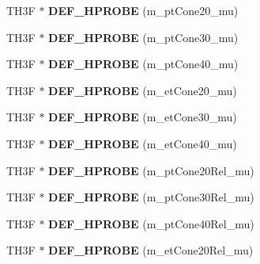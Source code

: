 \begin{DoxyCompactItemize}
\item 
\hypertarget{classHistos__Fake_a475ac1e1f52cff57c6d7583023360922}{
TH3F $\ast$ {\bfseries DEF\_\-HPROBE} (m\_\-ptCone20\_\-mu)}
\label{classHistos__Fake_a475ac1e1f52cff57c6d7583023360922}

\item 
\hypertarget{classHistos__Fake_affffd9bb2c5650168ac307b68db92f76}{
TH3F $\ast$ {\bfseries DEF\_\-HPROBE} (m\_\-ptCone30\_\-mu)}
\label{classHistos__Fake_affffd9bb2c5650168ac307b68db92f76}

\item 
\hypertarget{classHistos__Fake_adb2dddbadb36428151f48146053dbf1a}{
TH3F $\ast$ {\bfseries DEF\_\-HPROBE} (m\_\-ptCone40\_\-mu)}
\label{classHistos__Fake_adb2dddbadb36428151f48146053dbf1a}

\item 
\hypertarget{classHistos__Fake_a6510536fb7509e2d90d6aa930b7a2047}{
TH3F $\ast$ {\bfseries DEF\_\-HPROBE} (m\_\-etCone20\_\-mu)}
\label{classHistos__Fake_a6510536fb7509e2d90d6aa930b7a2047}

\item 
\hypertarget{classHistos__Fake_a65332ea1819ac63e1da9eac1eefc8a5c}{
TH3F $\ast$ {\bfseries DEF\_\-HPROBE} (m\_\-etCone30\_\-mu)}
\label{classHistos__Fake_a65332ea1819ac63e1da9eac1eefc8a5c}

\item 
\hypertarget{classHistos__Fake_a4538d69bff48f24b2919ab3c187f0ced}{
TH3F $\ast$ {\bfseries DEF\_\-HPROBE} (m\_\-etCone40\_\-mu)}
\label{classHistos__Fake_a4538d69bff48f24b2919ab3c187f0ced}

\item 
\hypertarget{classHistos__Fake_ad2eecde6f6e21f032d753801fdd22b67}{
TH3F $\ast$ {\bfseries DEF\_\-HPROBE} (m\_\-ptCone20Rel\_\-mu)}
\label{classHistos__Fake_ad2eecde6f6e21f032d753801fdd22b67}

\item 
\hypertarget{classHistos__Fake_a4727081a4f7f7995b7aeca646e123488}{
TH3F $\ast$ {\bfseries DEF\_\-HPROBE} (m\_\-ptCone30Rel\_\-mu)}
\label{classHistos__Fake_a4727081a4f7f7995b7aeca646e123488}

\item 
\hypertarget{classHistos__Fake_a10db2e354aec6d97edd9a924a7db928f}{
TH3F $\ast$ {\bfseries DEF\_\-HPROBE} (m\_\-ptCone40Rel\_\-mu)}
\label{classHistos__Fake_a10db2e354aec6d97edd9a924a7db928f}

\item 
\hypertarget{classHistos__Fake_a1f2c41d840de20e629bf69ff9586841d}{
TH3F $\ast$ {\bfseries DEF\_\-HPROBE} (m\_\-etCone20Rel\_\-mu)}
\label{classHistos__Fake_a1f2c41d840de20e629bf69ff9586841d}


\end{DoxyCompactItemize}
